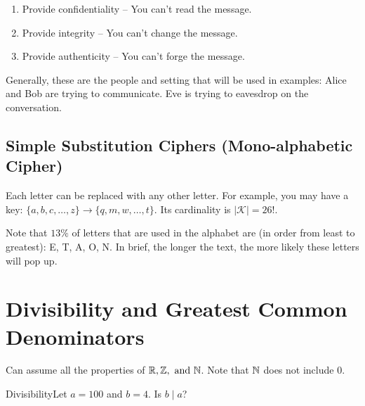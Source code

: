 \begin{enumerate}
    \item Provide confidentiality -- You can't read the message.
    \item Provide integrity -- You can't change the message.
    \item Provide authenticity -- You can't forge the message.
\end{enumerate}

Generally, these are the people and setting that will be used in examples: Alice and Bob are trying to communicate. Eve is trying to eavesdrop on the conversation. \\

\subsection{Simple Substitution Ciphers (Mono-alphabetic Cipher)}

Each letter can be replaced with any other letter. For example, you may have a key: \(\{a,b,c,\dots,z\} \rightarrow \{q,m,w,\dots,t\}\). Its cardinality is \(|\mathcal{K}| = 26!\). \\



 Note that \(13\%\) of letters that are used in the alphabet are (in order from least to greatest): E, T, A, O, N. In brief, the longer the text, the more likely these letters will pop up.

\section{Divisibility and Greatest Common Denominators}

Can assume all the properties of \(\mathbb{R}, \mathbb{Z}, \text{ and } \mathbb{N}\). Note that \(\mathbb{N}\) does not include 0. \\


\begin{example}
    {Divisibility}Let \(a = 100\) and \(b = 4\). Is \(b \mid a\)?
\end{example}

